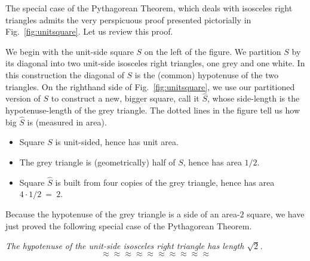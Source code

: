 
The special case of the Pythagorean Theorem, which deals with
isosceles right triangles admits the very perspicuous proof presented
pictorially in Fig.~\ref{fig:unitsquare}.  Let us review this proof.

We begin with the unit-side square $S$ on the left of the figure.  We
partition $S$ by its diagonal into two unit-side isosceles right
triangles, one grey and one white.  In this construction the diagonal
of $S$ is the (common) hypotenuse of the two triangles.  On the
righthand side of Fig.~\ref{fig:unitsquare}, we use our partitioned
version of $S$ to construct a new, bigger square, call it
$\widehat{S}$, whose side-length is the hypotenuse-length of the grey
triangle.  The dotted lines in the figure tell us how big
$\widehat{S}$ is (measured in area).
\begin{itemize}
\item
Square $S$ is unit-sided, hence has unit area.
\item
The grey triangle is (geometrically) half of $S$, hence has area
$1/2$.
\item
Square $\widehat{S}$ is built from four copies of the grey
triangle, hence has area $4 \cdot 1/2 \ = \ 2$.
\end{itemize}
Because the hypotenuse of the grey triangle is a side of an area-$2$
square, we have just proved the following special case of the
Pythagorean Theorem.

{\em The hypotenuse of the unit-side isosceles right triangle has
  length $\sqrt{2}$.}
\[ \approx \approx \approx \approx \approx \approx \approx \approx \approx \approx \]

